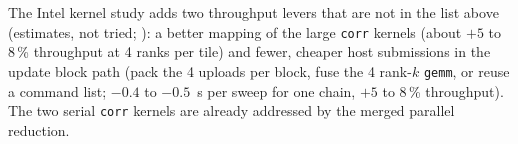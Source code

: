 The Intel kernel study adds two throughput levers that are not in the list above (estimates, not tried; ): a better mapping of the large \texttt{corr} kernels (about $+5$ to 8\,\% throughput at 4 ranks per tile) and fewer, cheaper host submissions in the update block path (pack the 4 uploads per block, fuse the 4 rank-$k$ \texttt{gemm}, or reuse a command list; $-0.4$ to $-0.5$~s per sweep for one chain, $+5$ to 8\,\% throughput). The two serial \texttt{corr} kernels are already addressed by the merged parallel reduction.
